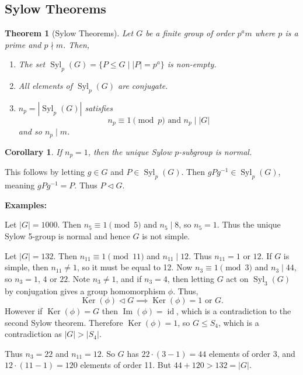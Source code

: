 \documentclass[12pt]{article}
\DeclareMathOperator{\Ker}{Ker}
\DeclareMathOperator{\Img}{Im}
\DeclareMathOperator{\id}{id}
\DeclareMathOperator{\Syl}{Syl}
\newtheorem{theorem}{Theorem}[section]
\newtheorem{corollary}{Corollary}[section]
\theoremstyle{definition}
\theoremstyle{remark}
\begin{document}
\subsection{Sylow Theorems}%
\label{sub:sylow_theorems}

\begin{theorem}[Sylow Theorems]
	Let $G$ be a finite group of order $p^{a}m$ where $p$ is a prime and $p \nmid m$. Then,
	\begin{enumerate}[label = (\roman*)]
		\item The set $\Syl_p(G) = \{P \leq G \mid  |P| = p^{a}\}$ is non-empty.
		\item All elements of $\Syl_p(G)$ are conjugate.
		\item $n_p = |\!\Syl_p(G)|$ satisfies
			\[
				n_p \equiv 1 \pmod p \text{ and } n_p \mid |G|
			\]
			and so $n_p \mid m$.
	\end{enumerate}
\end{theorem}

\begin{corollary}
	If $n_p = 1$, then the unique Sylow $p$-subgroup is normal.
\end{corollary}

This follows by letting $g \in G$ and $P \in \Syl_p(G)$. Then $gPg^{-1} \in \Syl_p(G)$, meaning $gPg^{-1} = P$. Thus $P \lhd G$.

\begin{adjustbox}{minipage = \columnwidth - 25.5pt, margin=1em, frame=1pt, margin=0em}
\textbf{Examples:}

Let $|G| = 1000$. Then $n_5 \equiv 1 \pmod 5$ and $n_5 \mid 8$, so $n_5 = 1$. Thus the unique Sylow 5-group is normal and hence $G$ is not simple.

Let $|G| = 132$. Then $n_{11} \equiv 1 \pmod 11$ and $n_{11} \mid 12$. Thus $n_{11} = 1$ or $12$. If $G$ is simple, then $n_{11} \neq 1$, so it must be equal to 12. Now $n_3 \equiv 1 \pmod 3$ and $n_3 \mid 44$, so $n_3 = 1$, $4$ or $22$. Note $n_3 \neq 1$, and if $n_3 = 4$, then letting $G$ act on $\Syl_3(G)$ by conjugation gives a group homomorphism $\phi$. Thus,
\[
	\Ker(\phi) \lhd G \implies \Ker(\phi) = 1 \text{ or } G
.\]
However if $\Ker(\phi) = G$ then $\Img(\phi) = \id$, which is a contradiction to the second Sylow theorem. Therefore $\Ker(\phi) = 1$, so $G \leq S_4$, which is a contradiction as $|G| > |S_4|$.

Thus $n_3 = 22$ and $n_{11} = 12$. So $G$ has $22 \cdot (3 - 1) = 44$ elements of order 3, and $12 \cdot (11 - 1) = 120$ elements of order 11. But $44 + 120 > 132 = |G|$.
\end{adjustbox}
\end{document}
